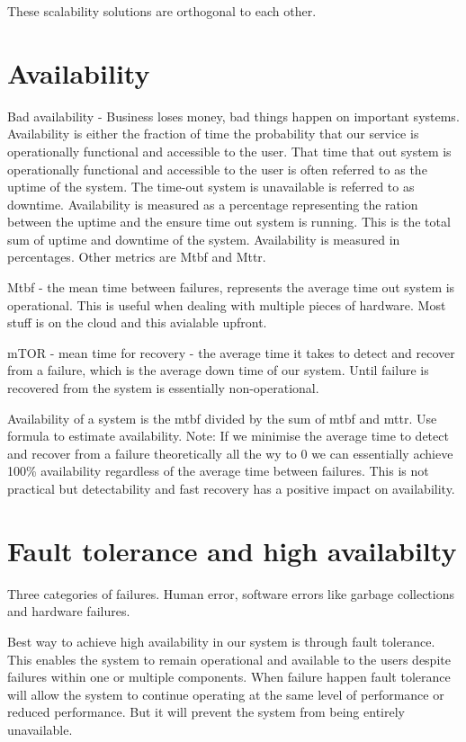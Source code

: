 \documentclass[a4paper, 11pt]{book}
\begin{document}
    These scalability solutions are orthogonal to each other.

    \section{Availability}
    Bad availability - Business loses money, bad things happen on important systems.
    Availability is either the fraction of time the probability that our service is operationally functional and accessible to the user.
    That time that out system is operationally functional and accessible to the user is often referred to as the uptime of the system.
    The time-out system is unavailable is referred to as downtime.
    Availability is measured as a percentage representing the ration between the uptime and the ensure time out system is running.
    This is the total sum of uptime and downtime of the system.
    Availability is measured in percentages.
    Other metrics are Mtbf and Mttr.

    Mtbf - the mean time between failures, represents the average time out system is operational.
    This is useful when dealing with multiple pieces of hardware. Most stuff is on the cloud and this avialable upfront.

    mTOR - mean time for recovery - the average time it takes to detect and recover from a failure, which is the average down time of our system.
    Until failure is recovered from the system is essentially non-operational.

    Availability of a system is the mtbf divided by the sum of mtbf and mttr.
    Use formula to estimate availability.
    Note: If we minimise the average time to detect and recover from a failure theoretically all the wy to 0 we can essentially achieve 100\%
    availability regardless of the average time between failures.
    This is not practical but detectability and fast recovery has a positive impact on availability.


    \section{Fault tolerance and high availabilty}
    Three categories of failures.
    Human error, software errors like garbage collections and hardware failures.

    Best way to achieve high availability in our system is through fault tolerance.
    This enables the system to remain operational and available to the users despite failures within one or multiple components.
    When failure happen fault tolerance will allow the system to continue operating at the same level of performance or reduced performance.
    But it will prevent the system from being entirely unavailable.
\end{document}
